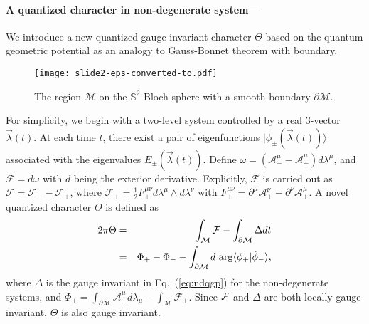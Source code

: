 \documentclass[aps,pra,twocolumn,groupedaddress,10pt]{revtex4}
\def\nn{\nonumber}
\begin{document}
\paragraph*{A quantized character in non-degenerate system---}
We introduce a new quantized gauge invariant character
$\Theta$ based on the quantum geometric potential as an analogy to Gauss-Bonnet
theorem with boundary.
\begin{figure}
\texttt{[image: slide2-eps-converted-to.pdf]}
\caption{The region $\mathcal{M}$ on the $\mathbb{S}^2 $
Bloch sphere with a smooth boundary $\partial\mathcal{M}$.}
\label{f1}
\end{figure}
For simplicity, we begin with a two-level system controlled
by a real 3-vector $\vec{\lambda}(t)$.
At each time $t$, there exist a pair of eigenfunctions
$|\phi_{\pm}(\vec{\lambda}(t))\rangle$ associated with
the eigenvalues $E_{\pm}(\vec{\lambda}(t))$.
Define $\omega = (\mathcal{A}_{-}^{\mu}-\mathcal{A}_{+}^{\mu})
d\lambda^{\mu}$, and $\mathcal{F} = d\omega$ with $d$ being
the exterior derivative.
Explicitly, $\mathcal{F}$ is carried out as
$\mathcal{F} = \mathcal{F}_- -\mathcal{F}_+ $,
where $\mathcal{F}_{\pm} = \frac{1}{2}F_{\pm}^{\mu\nu} d\lambda^{\mu}\wedge d\lambda^{\nu}$
with $F^{\mu\nu}_{\pm} = \partial^\mu
\mathcal{A}^{\nu}_{\pm} - \partial^\nu \mathcal{A}^{\mu}_{\pm}$.
A novel quantized character $\Theta$ is defined as
\begin{eqnarray}\label{theta}
2\pi\Theta &=&\int_{\mathcal{M}}\mathcal{F} -
\int_{\partial\mathcal{M}} \Delta dt\nn \\
&=&\Phi_+ - \Phi_-
-\int_{\partial \mathcal{M}}d ~{\rm{arg}}\langle\phi_+|\dot{\phi}_-\rangle,
\end{eqnarray}
where $\Delta$ is the gauge invariant
in Eq.~(\ref{eq:ndqgp}) for the non-degenerate systems, and
$\Phi_\pm=
\int_{\partial \mathcal{M}}\mathcal{A}_{\pm}^{\mu}d\lambda_{\mu} - \int_{\mathcal{M}}\mathcal{F}_{\pm}$.
Since $\cal F$ and $\Delta$ are both locally gauge invariant,
$\Theta$ is also gauge invariant.
\end{document}
